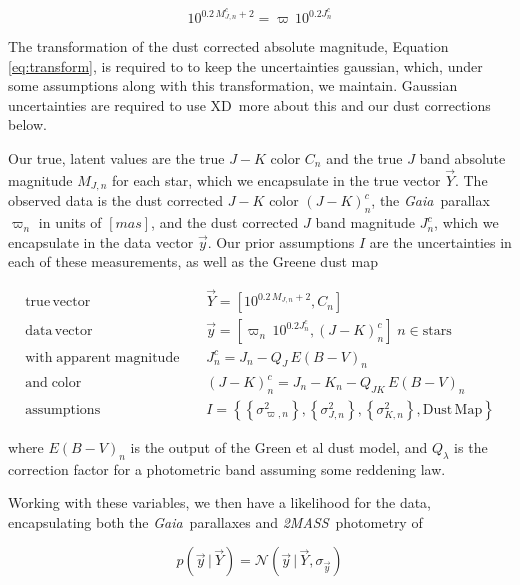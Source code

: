 \documentclass[modern]{aastex61}
\newcommand{\acronym}[1]{{\small{#1}}}
\newcommand{\project}[1]{\textsl{#1}}
\newcommand{\tmass}{\project{\acronym{2MASS}}}
\newcommand{\gaia}{\project{Gaia}}
\newcommand{\xd}{\acronym{XD}}
\newcommand{\given}{\,|\,}
\begin{document}
\begin{equation}
10^{0.2\,M^c_{J,n} + 2} = \varpi\,10^{0.2J^c_n}
\label{eq:transform}
\end{equation}

The transformation of the dust corrected absolute magnitude, Equation \ref{eq:transform}, is required to to keep the uncertainties gaussian, which, under some assumptions along with this transformation, we maintain. Gaussian uncertainties are required to use \xd\, more about this and our dust corrections below.

Our true, latent values are the true $J-K$ color $C_n$ and the true $J$ band absolute magnitude $M_{J,n}$ for each star, which we encapsulate in the true vector $\vec{Y}$. The observed data is the dust corrected $J-K$ color $(J-K)^c_n$, the \gaia\ parallax $\varpi_n$ in units of $[mas]$, and the dust corrected $J$ band magnitude $J^c_n$, which we encapsulate in the data vector $\vec{y}$. Our prior assumptions $I$ are the uncertainties in each of these measurements, as well as the Greene dust map

\begin{equation}
\begin{aligned}
\mathrm{true \, vector} \;\;\;\; &\vec{Y} = [10^{0.2\,M_{J,n} + 2}, C_n] \\
\mathrm{data \, vector} \;\;\;\; &\vec{y} = [\varpi_n\,10^{0.2J^c_n}, (J- K)^c_n] \;  n \in \mathrm{stars} \\
\mathrm{with \; apparent \; magnitude} \;\;\;\; &J^c_n = J_n - Q_J\,E(B-V)_n \\
\mathrm{and \; color} \;\;\;\; &(J - K)^c_n = J_n - K_n - Q_{JK}\,E(B-V)_n \\
\mathrm{assumptions} \;\;\;\; &I = \left\{\left\{\sigma^2_{\varpi, n}\right\}, \left\{\sigma^2_{J,n}\right\}, \left\{\sigma^2_{K,n}\right\}, \mathrm{Dust \, Map}\right\}
\end{aligned}
\label{eq:data}
\end{equation}

where $E(B-V)_n$ is the output of the Green et al dust model, and $Q_{\lambda}$ is the correction factor for a photometric band assuming some reddening law.

Working with these variables, we then have a likelihood for the data, encapsulating both the \gaia\ parallaxes and \tmass\ photometry of

\begin{equation}
p(\vec{y} \given \vec{Y}) = \mathcal{N}(\vec{y} \given \vec{Y}, \sigma_{\vec{y}})
\label{eq:fulllike}
\end{equation}
\end{document}
